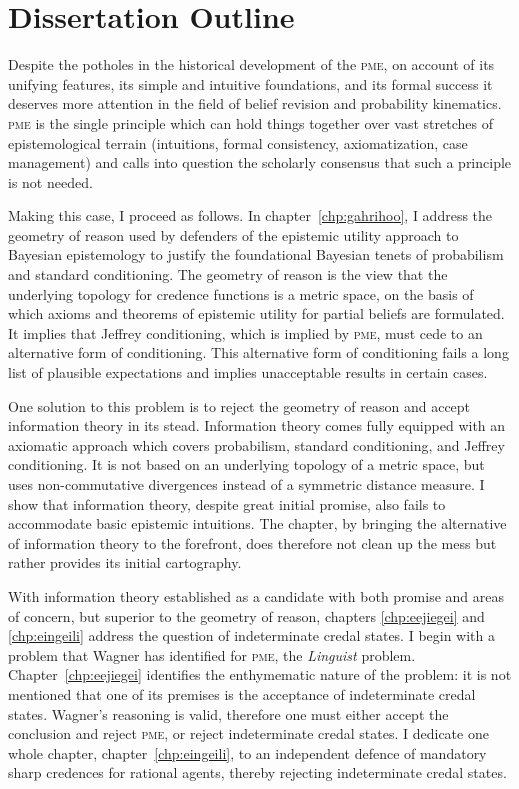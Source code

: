 \documentclass[phd,12pt,oneside]{ubcthesis}
\begin{document}
\section{Dissertation Outline}
\label{sec:cohwaefi}

Despite the potholes in the historical development of the
\textsc{pme}, on account of its unifying features, its simple and
intuitive foundations, and its formal success it deserves more
attention in the field of belief revision and probability kinematics.
\textsc{pme} is the single principle which can hold things together
over vast stretches of epistemological terrain (intuitions, formal
consistency, axiomatization, case management) and calls into question
the scholarly consensus that such a principle is not needed.

Making this case, I proceed as follows. In chapter~\ref{chp:gahrihoo},
I address the geometry of reason used by defenders of the epistemic
utility approach to Bayesian epistemology to justify the foundational
Bayesian tenets of probabilism and standard conditioning. The geometry
of reason is the view that the underlying topology for credence
functions is a metric space, on the basis of which axioms and theorems
of epistemic utility for partial beliefs are formulated. It implies
that Jeffrey conditioning, which is implied by \textsc{pme}, must cede
to an alternative form of conditioning. This alternative form of
conditioning fails a long list of plausible expectations and implies
unacceptable results in certain cases. 

One solution to this problem is to reject the geometry of reason and
accept information theory in its stead. Information theory comes fully
equipped with an axiomatic approach which covers probabilism, standard
conditioning, and Jeffrey conditioning. It is not based on an
underlying topology of a metric space, but uses non-commutative
divergences instead of a symmetric distance measure. I show that
information theory, despite great initial promise, also fails to
accommodate basic epistemic intuitions. The chapter, by bringing the
alternative of information theory to the forefront, does therefore not
clean up the mess but rather provides its initial cartography.

With information theory established as a candidate with both promise
and areas of concern, but superior to the geometry of reason, chapters
\ref{chp:eejiegei} and \ref{chp:eingeili} address the question of
indeterminate credal states. I begin with a problem that Wagner has
identified for \textsc{pme}, the \emph{Linguist} problem.
Chapter~\ref{chp:eejiegei} identifies the enthymematic nature of the
problem: it is not mentioned that one of its premises is the
acceptance of indeterminate credal states. Wagner's reasoning is
valid, therefore one must either accept the conclusion and reject
\textsc{pme}, or reject indeterminate credal states. I dedicate one
whole chapter, chapter~\ref{chp:eingeili}, to an independent defence
of mandatory sharp credences for rational agents, thereby rejecting
indeterminate credal states.
\end{document}
